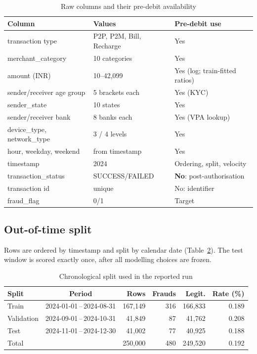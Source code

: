 \documentclass[conference]{IEEEtran}
\begin{document}
\begin{table}[t]
\centering
\caption{Raw columns and their pre-debit availability}\label{tab:schema}
\footnotesize
\setlength{\tabcolsep}{3pt}
\begin{tabular}{@{}p{2.45cm}p{2.25cm}p{2.85cm}@{}}
\toprule
Column & Values & Pre-debit use \\
\midrule
transaction type & P2P, P2M, Bill, Recharge & Yes \\
merchant\_category & 10 categories & Yes \\
amount (INR) & 10--42,099 & Yes (log; train-fitted ratios) \\
sender/receiver age group & 5 brackets each & Yes (KYC) \\
sender\_state & 10 states & Yes \\
sender/receiver bank & 8 banks each & Yes (VPA lookup) \\
device\_type, network\_type & 3 / 4 levels & Yes \\
hour, weekday, weekend & from timestamp & Yes \\
timestamp & 2024 & Ordering, split, velocity \\
transaction\_status & SUCCESS/FAILED & \textbf{No}: post-authorisation \\
transaction id & unique & No: identifier \\
fraud\_flag & 0/1 & Target \\
\bottomrule
\end{tabular}
\end{table}

\subsection{Out-of-time split}
Rows are ordered by timestamp and split by calendar date (Table~\ref{tab:split}). The test window is scored exactly once, after all modelling choices are frozen.

\begin{table}[t]
\centering
\caption{Chronological split used in the reported run}\label{tab:split}
\footnotesize
\setlength{\tabcolsep}{3pt}
\begin{tabular}{@{}lcrrrr@{}}
\toprule
Split & Period & Rows & Frauds & Legit. & Rate (\%) \\
\midrule
Train & 2024-01-01\,--\,2024-08-31 & 167,149 & 316 & 166,833 & 0.189 \\
Validation & 2024-09-01\,--\,2024-10-31 & 41,849 & 87 & 41,762 & 0.208 \\
Test & 2024-11-01\,--\,2024-12-30 & 41,002 & 77 & 40,925 & 0.188 \\
\midrule
Total & & 250,000 & 480 & 249,520 & 0.192 \\
\bottomrule
\end{tabular}
\end{table}
\end{document}
